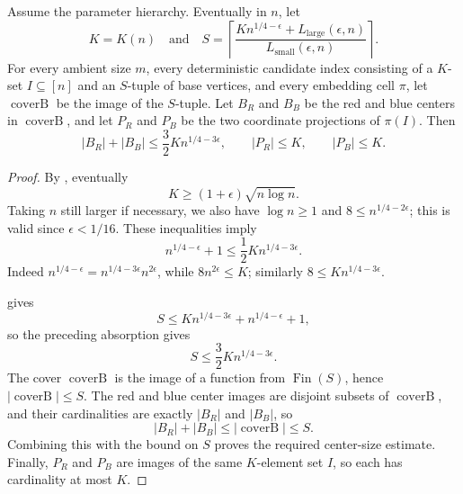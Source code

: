 \begin{helper}
Assume the parameter hierarchy.  Eventually in \(n\), let
\[
  K=K(n) \quad\text{and}\quad
  S=\left\lceil
    \frac{K n^{1/4-\epsilon}+L_{\mathrm{large}}(\epsilon,n)}
         {L_{\mathrm{small}}(\epsilon,n)}
  \right\rceil .
\]
For every ambient size \(m\), every deterministic candidate index consisting
of a \(K\)-set \(I\subseteq[n]\) and an \(S\)-tuple of base vertices, and every
embedding cell \(\pi\), let \(\operatorname{coverB}\) be the image of the
\(S\)-tuple.  Let \(B_R\) and \(B_B\) be the red and blue centers in
\(\operatorname{coverB}\), and let \(P_R\) and \(P_B\) be the two coordinate
projections of \(\pi(I)\).  Then
\[
  |B_R|+|B_B|
    \le \frac32 K n^{1/4-3\epsilon},
  \qquad |P_R|\le K,\qquad |P_B|\le K .
\]
\end{helper}
\begin{proof}
By , eventually
\[
  K\ge (1+\epsilon)\sqrt{n\log n}.
\]
Taking \(n\) still larger if necessary, we also have \(\log n\ge 1\) and
\(8\le n^{1/4-2\epsilon}\); this is valid since \(\epsilon<1/16\).  These
inequalities imply
\[
  n^{1/4-\epsilon}+1
    \le \frac12 K n^{1/4-3\epsilon}.
\]
Indeed \(n^{1/4-\epsilon}=n^{1/4-3\epsilon}n^{2\epsilon}\), while
\(8n^{2\epsilon}\le K\); similarly \(8\le K n^{1/4-3\epsilon}\).

 gives
\[
  S\le K n^{1/4-3\epsilon}+n^{1/4-\epsilon}+1,
\]
so the preceding absorption gives
\[
  S\le \frac32 K n^{1/4-3\epsilon}.
\]
The cover \(\operatorname{coverB}\) is the image of a function from
\(\operatorname{Fin}(S)\), hence \(|\operatorname{coverB}|\le S\).
The red and blue center images are disjoint subsets of
\(\operatorname{coverB}\), and their cardinalities are exactly
\(|B_R|\) and \(|B_B|\), so
\[
  |B_R|+|B_B|\le |\operatorname{coverB}|\le S.
\]
Combining this with the bound on \(S\) proves the required center-size
estimate.  Finally, \(P_R\) and \(P_B\) are images of the same \(K\)-element
set \(I\), so each has cardinality at most \(K\).
\end{proof}
